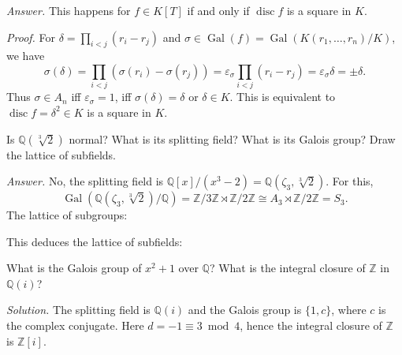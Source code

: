 \documentclass{mathproblems}
\newcommand\Q{\mathbb{Q}}
\newcommand\Z{\mathbb{Z}}
\DeclareMathOperator{\Gal}{Gal}
\begin{document}
\begin{questions}
\textit{Answer.}
This happens for $f\in K[T]$ if and only if $\operatorname{disc} f$ is a square in $K$. 

\textit{Proof.}
For $\delta=\prod_{i<j}(r_i-r_j)$ and $\sigma\in \Gal(f)=\Gal(K(r_1,\ldots,r_n)/K)$, we have
$$
\sigma (\delta)=\prod_{i<j}(\sigma(r_i)-\sigma(r_j))=\varepsilon_{\sigma} \prod_{i<j}(r_i-r_j)=\varepsilon_{\sigma} \delta=\pm \delta.
$$
Thus $\sigma\in A_n$ iff $\varepsilon_{\sigma}=1$, iff $\sigma(\delta)=\delta$ or $\delta\in K$. This is equivalent to $\operatorname{disc} f=\delta^2\in K$ is a square in $K$.

\miquestion
{\color{blue} Is $\Q(\sqrt[3]{2})$ normal? What is its splitting field? What is its Galois group? Draw the lattice of subfields.}

\textit{Answer.}
No, the splitting field is $\Q[x]/(x^3-2)=\Q(\zeta_3, \sqrt[3]{2})$. For this,
$$
\Gal(\Q(\zeta_3, \sqrt[3]{2})/\Q)=\Z/3\Z \rtimes \Z/2\Z\cong A_3 \rtimes \Z/2\Z=S_3.
$$
The lattice of subgroups:
\begin{center}
\end{center}
This deduces the lattice of subfields:
\begin{center}
\end{center}


\miquestion
{\color{blue} What is the Galois group of $x^2+1$ over $\Q$? What is the integral closure of $\Z$ in $\Q(i)$?}

\textit{Solution.}
The splitting field is $\Q(i)$ and the Galois group is $\{1,c\}$, where $c$ is the complex conjugate. Here $d=-1\equiv 3\bmod 4$, hence the integral closure of $\Z$ is $\Z[i]$.


\end{questions}
\end{document}
